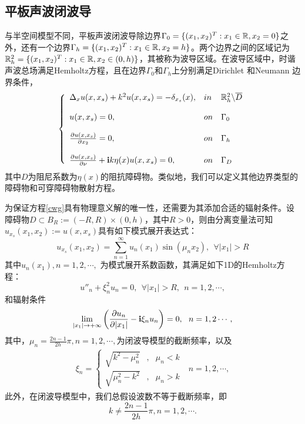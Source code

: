 \subsection{平板声波闭波导}
与半空间模型不同，平板声波闭波导除边界$\Gamma_0=\{(x_1,x_2)^T:x_1\in\mathbb{R},x_2=0\}$之外，还有一个边界$\Gamma_h=\{(x_1,x_2)^T:x_1\in\mathbb{R},x_2=h\}$。两个边界之间的区域记为$\mathbb{R}^2_h=\{(x_1,x_2)^T:x_1\in\mathbb{R},x_2\in(0,h)\}$，其被称为波导区域。在波导区域中，时谐声波总场满足Hemholtz方程，且在边界$\Gamma_0$和$\Gamma_h$上分别满足Dirichlet 和Neumann 边界条件，
\begin{eqnarray}\label{cwg}
\left\{
\begin{array}{lll}
   \Delta_x u(x,x_s)+k^2u(x,x_s)=-\delta_{x_s}(x),& in&\mathbb{R}^2_h\backslash\overline{D}\\
   & &\\
   u(x,x_s)=0,& on&\Gamma_0\\
   & &\\
   \frac{\partial u(x,x_s)}{\partial x_2}=0,& on&\Gamma_h\\
   & &\\
   \frac{\partial u(x,x_s)}{\partial\nu}+\mathbf{i} k\eta(x)u(x,x_s)=0,& on&\Gamma_D
\end{array}
\right.
\end{eqnarray}
其中$D$为阻尼系数为$\eta(x)$的阻抗障碍物。类似地，我们可以定义其他边界类型的障碍物和可穿障碍物散射方程。

为保证方程\eqref{cwg}具有物理意义解的唯一性，还需要为其添加合适的辐射条件。设障碍物$D\subset B_R:=(-R,R)\times(0,h)$，其中$R>0$，则由分离变量法可知$u_{x_s}(x_1,x_2):=u(x,x_s)$具有如下模式展开表达式：
\begin{equation}
  u_{x_s}(x_1,x_2)=\sum\limits_{n=1}^{\infty}u_n(x_1)\sin(\mu_nx_2),\ \ \forall |x_1|>R
\end{equation}
其中$u_n(x_1),n=1,2,\cdots,$ 为模式展开系数函数，其满足如下1D的Hemholtz方程：
\begin{equation}\label{cwg_mec}
  u''_n+\xi^2_nu_n=0,\ \ \forall |x_1|>R,\ \ n=1,2,\cdots,
\end{equation}
和辐射条件
\begin{equation}\label{cwg_rad}
 \lim\limits_{|x_1|\rightarrow+\infty}\left(\frac{\partial u_n}{\partial|x_1|}-\mathbf{i}\xi_nu_n\right)=0,\ \ n=1,2\cdots,
\end{equation}
其中，$\mu_n=\frac{2n-1}{2h}\pi,n=1,2,\cdots,$为闭波导模型的截断频率，以及
\begin{eqnarray}
 \xi_n=\left\{
\begin{array}{lll}
   \sqrt{k^2-\mu_n^2}&,&\mu_n<k\\
   \sqrt{\mu_n^2-k^2}&,&\mu_n>k
\end{array}
\right.
\ \ \ n=1,2,\cdots,
\end{eqnarray}
此外，在闭波导模型中，我们总假设波数不等于截断频率，即
\begin{equation}
  k\neq\frac{2n-1}{2h}\pi,n=1,2,\cdots.
\end{equation}

